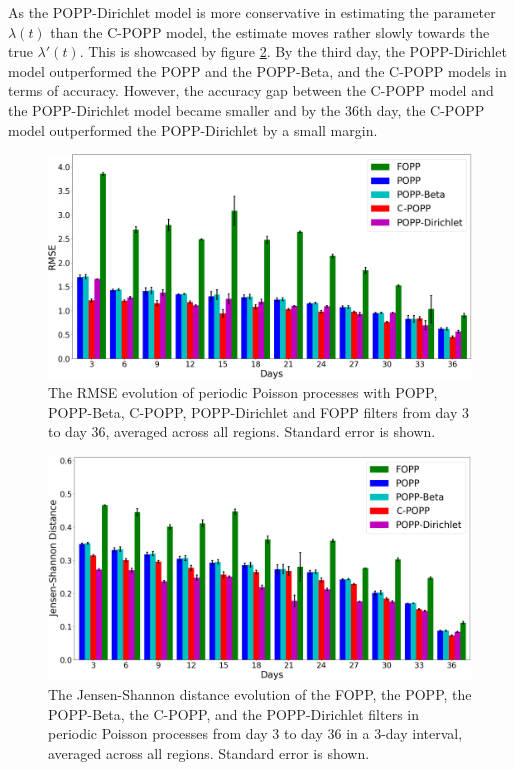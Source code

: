 As the POPP-Dirichlet model is more conservative in estimating the parameter $\lambda(t)$ than the C-POPP model, the estimate moves rather slowly towards the true $\lambda'(t)$. This is showcased by figure \ref{fig:fopp_popp_popb_npop_popd_kl_evo}.
By the third day, the POPP-Dirichlet model outperformed the POPP and the POPP-Beta, and the C-POPP models in terms of accuracy. However, the accuracy gap between the C-POPP model and the POPP-Dirichlet model became smaller and by the 36th day, the C-POPP model outperformed the POPP-Dirichlet by a small margin.

\begin{figure}[t!]
	\centering
	\includegraphics[width=0.95\columnwidth]{./figures/fopp_popp_popb_npop_popd_rmse_evo.png}
	\caption{The RMSE evolution of periodic Poisson processes with POPP, POPP-Beta, C-POPP, POPP-Dirichlet and FOPP filters from day 3 to day 36, averaged across all regions. Standard error is shown.}
	\label{fig:fopp_popp_popb_npop_popd_rmse_evo}
\end{figure}

\begin{figure}[t!]
	\centering
	\includegraphics[width=0.95\columnwidth]{./figures/fopp_popp_popb_npop_popd_kl_evo.png}
	\caption{The Jensen-Shannon distance evolution of the FOPP, the POPP, the POPP-Beta, the C-POPP, and the POPP-Dirichlet filters in periodic Poisson processes from day 3 to day 36 in a 3-day interval, averaged across all regions. Standard error is shown.}
	\label{fig:fopp_popp_popb_npop_popd_kl_evo}
\end{figure}

